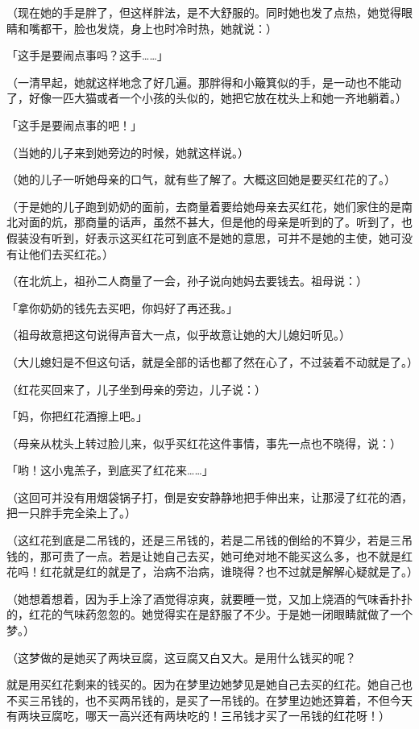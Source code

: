 \documentclass[UTF8]{ctexart}
\begin{document}
（现在她的手是胖了，但这样胖法，是不大舒服的。同时她也发了点热，她觉得眼睛和嘴都干，脸也发烧，身上也时冷时热，她就说：）

「这手是要闹点事吗？这手……」

（一清早起，她就这样地念了好几遍。那胖得和小簸箕似的手，是一动也不能动了，好像一匹大猫或者一个小孩的头似的，她把它放在枕头上和她一齐地躺着。）

「这手是要闹点事的吧！」

（当她的儿子来到她旁边的时候，她就这样说。）

（她的儿子一听她母亲的口气，就有些了解了。大概这回她是要买红花的了。）

（于是她的儿子跑到奶奶的面前，去商量着要给她母亲去买红花，她们家住的是南北对面的炕，那商量的话声，虽然不甚大，但是他的母亲是听到的了。听到了，也假装没有听到，好表示这买红花可到底不是她的意思，可并不是她的主使，她可没有让他们去买红花。）

（在北炕上，祖孙二人商量了一会，孙子说向她妈去要钱去。祖母说：）

「拿你奶奶的钱先去买吧，你妈好了再还我。」

（祖母故意把这句说得声音大一点，似乎故意让她的大儿媳妇听见。）

（大儿媳妇是不但这句话，就是全部的话也都了然在心了，不过装着不动就是了。）

（红花买回来了，儿子坐到母亲的旁边，儿子说：）

「妈，你把红花酒擦上吧。」

（母亲从枕头上转过脸儿来，似乎买红花这件事情，事先一点也不晓得，说：）

「哟！这小鬼羔子，到底买了红花来……」

（这回可并没有用烟袋锅子打，倒是安安静静地把手伸出来，让那浸了红花的酒，把一只胖手完全染上了。）

（这红花到底是二吊钱的，还是三吊钱的，若是二吊钱的倒给的不算少，若是三吊钱的，那可贵了一点。若是让她自己去买，她可绝对地不能买这么多，也不就是红花吗！红花就是红的就是了，治病不治病，谁晓得？也不过就是解解心疑就是了。）

（她想着想着，因为手上涂了酒觉得凉爽，就要睡一觉，又加上烧酒的气味香扑扑的，红花的气味药忽忽的。她觉得实在是舒服了不少。于是她一闭眼睛就做了一个梦。）

（这梦做的是她买了两块豆腐，这豆腐又白又大。是用什么钱买的呢？

就是用买红花剩来的钱买的。因为在梦里边她梦见是她自己去买的红花。她自己也不买三吊钱的，也不买两吊钱的，是买了一吊钱的。在梦里边她还算着，不但今天有两块豆腐吃，哪天一高兴还有两块吃的！三吊钱才买了一吊钱的红花呀！）
\end{document}
